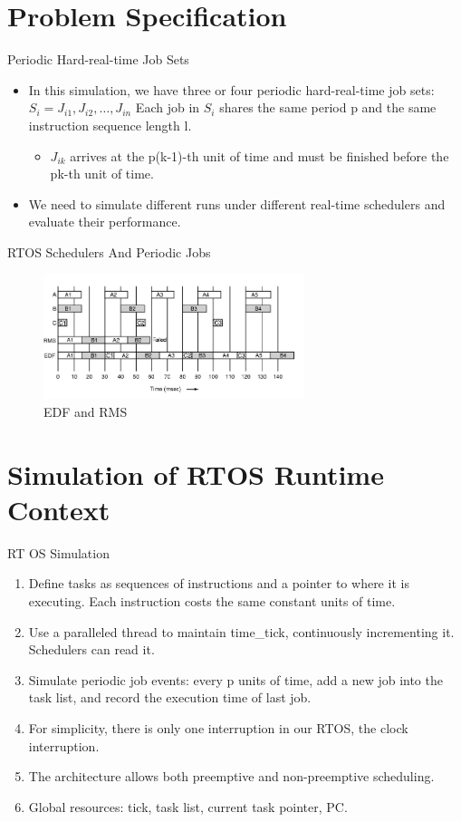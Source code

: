 ﻿\documentclass{beamer}
\begin{document}
\section{Problem Specification}
\begin{frame}{Periodic Hard-real-time Job Sets}              %
  \begin{itemize}
  \item In this simulation, we have three or four periodic hard-real-time job sets:\\ \pause
        $S_i={J_{i1}, J_{i2}, \ldots, J_{in}}$ Each job in $S_i$ shares the same period p and the same instruction sequence length l.\pause
    \begin{itemize}
    \item $J_{ik}$ arrives at the p(k-1)-th unit of time and must be finished before the pk-th unit of time.    \pause
    \end{itemize}
  \item We need to simulate different runs under different real-time schedulers and evaluate their performance.\pause
  \end{itemize}
\end{frame}

\begin{frame}{RTOS Schedulers And Periodic Jobs}
  \begin{figure}[H]
    \includegraphics[width=3in]{2.PNG}
    \caption{EDF and RMS}
  \end{figure}
\end{frame}

\section{Simulation of RTOS Runtime Context}
\begin{frame}{RT OS Simulation}
  \begin{enumerate}
  \item Define tasks as sequences of instructions and a pointer to where it is executing. Each instruction costs the same constant units of time. \pause
  \item Use a paralleled thread to maintain time\_tick, continuously incrementing it. Schedulers can read it.\pause
  \item Simulate periodic job events: every p units of time, add a new job into the task list, and record the execution time of last job. \pause
  \item For simplicity, there is only one interruption in our RTOS, the clock interruption.\pause
  \item The architecture allows both preemptive and non-preemptive scheduling.\pause
  \item Global resources: tick, task list, current task pointer, PC.
  \end{enumerate}
\end{frame}
\end{document}
